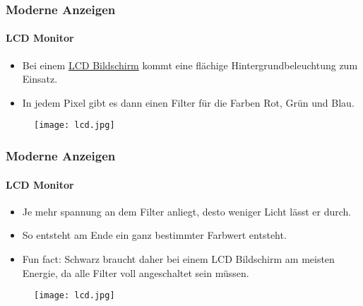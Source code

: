 \begin{frame}
    \frametitle{Moderne Anzeigen}
    \framesubtitle{LCD Monitor}
    \begin{minipage}{0.5\textwidth}
        \begin{itemize}
            \item Bei einem \href{https://de.wikipedia.org/wiki/Fl\%C3\%BCssigkristallanzeige}{LCD Bildschirm} kommt eine flächige Hintergrundbeleuchtung zum Einsatz.
            \item In jedem Pixel gibt es dann einen Filter für die Farben Rot, Grün und Blau.
        \end{itemize}
    \end{minipage} \hfill
    \begin{minipage}{0.45\textwidth}
        \begin{figure}
            \texttt{[image: lcd.jpg]}
        \end{figure}
    \end{minipage}
\end{frame}

\begin{frame}
    \frametitle{Moderne Anzeigen}
    \framesubtitle{LCD Monitor}
    \begin{minipage}{0.5\textwidth}
        \begin{itemize}
            \item Je mehr spannung an dem Filter anliegt, desto weniger Licht lässt er durch.
            \item So entsteht am Ende ein ganz bestimmter Farbwert entsteht.
            \item Fun fact: Schwarz braucht daher bei einem LCD Bildschirm am meisten Energie, da alle Filter voll angeschaltet sein müssen.
        \end{itemize}
    \end{minipage} \hfill
    \begin{minipage}{0.45\textwidth}
        \begin{figure}
            \texttt{[image: lcd.jpg]}
        \end{figure}
    \end{minipage}
\end{frame}

